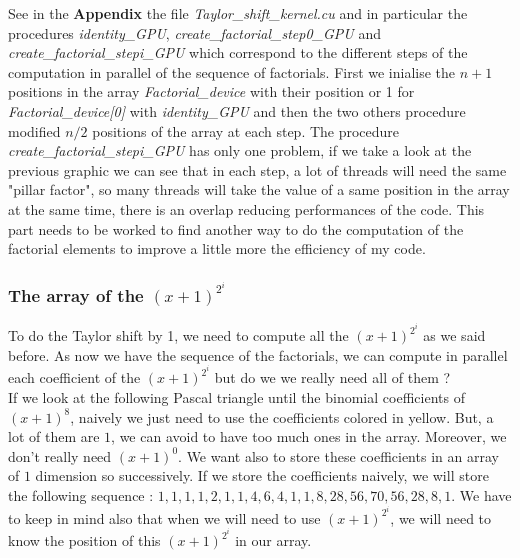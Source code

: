 See in the \textbf{Appendix} the file \textit{Taylor\_shift\_kernel.cu} and in particular the procedures \textit{identity\_GPU}, \textit{create\_factorial\_step0\_GPU} and \textit{create\_factorial\_stepi\_GPU} which correspond to the different steps of the computation in parallel of the sequence of factorials. First we inialise the $n+1$ positions in the array \textit{Factorial\_device} with their position or 1 for \textit{Factorial\_device[0]} with \textit{identity\_GPU} and then the two others procedure modified $n/2$ positions of the array at each step. The procedure \textit{create\_factorial\_stepi\_GPU} has only one problem, if we take a look at the previous graphic we can see that in each step, a lot of threads will need the same "pillar factor", so many threads will take the value of a same position in the array at the same time, there is an overlap reducing performances of the code. This part needs to be worked to find another way to do the computation of the factorial elements to improve a little more the efficiency of my code.

\subsubsection{The array of the $(x+1)^{2^i}$}
To do the Taylor shift by 1, we need to compute all the $(x+1)^{2^i}$ as we said before. As now we have the sequence of the factorials, we can compute in parallel each coefficient of the $(x+1)^{2^i}$  but do we we really need all of them ? \\

If we look at the following Pascal triangle until the binomial coefficients of $(x+1)^{8}$, naively we just need to use the coefficients colored in yellow. But, a lot of them are $1$, we can avoid to have too much ones in the array. Moreover, we don't really need $(x+1)^0$. We want also to store these coefficients in an array of $1$ dimension so successively. If we store the coefficients naively, we will store the following sequence : $1,1,1,1,2,1,1,4,6,4,1,1,8,28,56,70,56,28,8,1$. We have to keep in mind also that when we will need to use $(x+1)^{2^i}$, we will need to know the position of this $(x+1)^{2^i}$ in our array. \\


